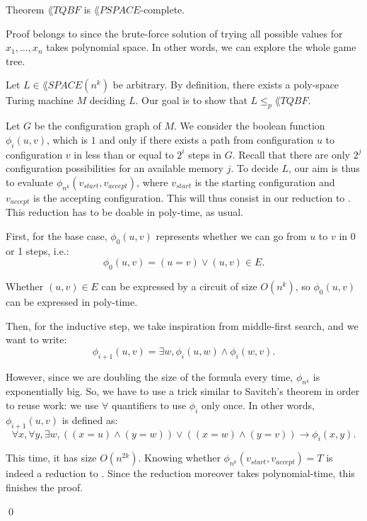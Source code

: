 \documentclass[a4paper]{article}
\begin{document}
\begin{parag}{Theorem}
    $\lang{TQBF}$ is $\lang{PSPACE}$-complete.

    \begin{subparag}{Proof}
         belongs to  since the brute-force solution of trying all possible values for $x_1, \ldots, x_n$ takes polynomial space. In other words, we can explore the whole game tree.

        Let $L \in \lang{SPACE}\left(n^k\right)$ be arbitrary. By definition, there exists a poly-space Turing machine $M$ deciding $L$. Our goal is to show that $L \leq_p \lang{TQBF}$.

        Let $G$ be the configuration graph of $M$. We consider the boolean function $\phi_i\left(u, v\right)$, which is $1$ and only if there exists a path from configuration $u$ to configuration $v$ in less than or equal to $2^{i}$ steps in $G$. Recall that there are only $2^j$ configuration possibilities for an available memory $j$. To decide $L$, our aim is thus to evaluate $\phi_{n^k}\left(v_{start}, v_{accept}\right)$, where $v_{start}$ is the starting configuration and $v_{accept}$ is the accepting configuration. This will thus consist in our reduction to . This reduction has to be doable in poly-time, as usual.

        First, for the base case, $\phi_0\left(u, v\right)$ represents whether we can go from $u$ to $v$ in 0 or 1 steps, i.e.:
        \[\phi_0\left(u, v\right) = \left(u = v\right) \lor \left(u, v\right) \in E.\]

        Whether $\left(u, v\right) \in E$ can be expressed by a circuit of size $O\left(n^k\right)$, so $\phi_0\left(u, v\right)$ can be expressed in poly-time.

        Then, for the inductive step, we take inspiration from middle-first search, and we want to write: 
        \[\phi_{i+1}\left(u, v\right) = \exists w, \phi_i\left(u, w\right) \land \phi_i\left(w, v\right).\]

        However, since we are doubling the size of the formula every time, $\phi_{n^k}$ is exponentially big. So, we have to use a trick similar to Savitch's theorem in order to reuse work: we use $\forall$ quantifiers to use $\phi_i$ only once. In other words, $\phi_{i+1}\left(u, v\right)$ is defined as: 
        \[\forall x, \forall y, \exists w, \left(\left(x = u\right) \land \left(y = w\right)\right) \lor \left(\left(x = w\right) \land \left(y=v\right)\right) \to \phi_i\left(x, y\right).\]

        This time, it has size $O\left(n^{2k}\right)$. Knowing whether $\phi_{n^k}\left(v_{start}, v_{accept}\right) = T$ is indeed a reduction to . Since the reduction moreover takes polynomial-time, this finishes the proof.

        \qed
    \end{subparag}
\end{parag}
\end{document}
